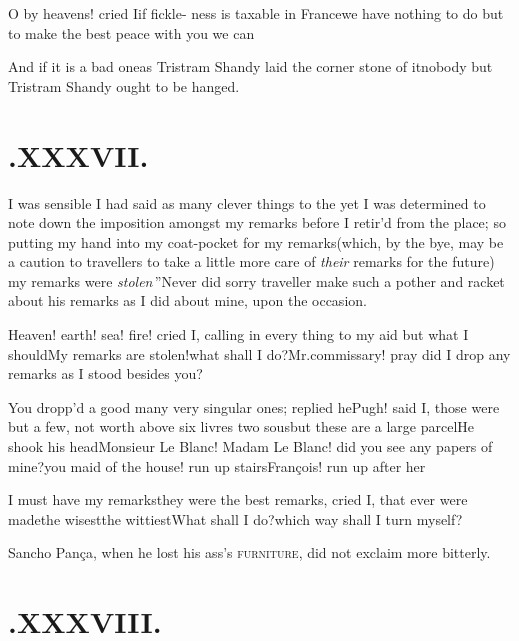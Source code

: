 \documentclass{article}
\begin{document}
\tsh O by heavens! cried I\tsk if
fickle-\break
ness is taxable in France\tsk we have no\-thing to do
but to make the best peace with you we can\tsh\\[4pt]

\tsh And if it is a bad one\tsk as Tris\-tram
Shandy laid the corner stone of it\tsk nobody but Tristram
Shandy ought to be hanged.

\section{.\enspace XXXVII.}

 I was sensible I had said as
many clever things to the
\break 
yet I was determined to note down the imposition amongst my
remarks before I
retir’d from the place; so putting my hand into my
coat-pocket for my remarks\tsk (which, by the bye, may be a
caution to travellers to take a little more care of \textit{their}
remarks for the future) \lqq my\break
\lqq remarks were \textit{stolen}\,”\tsh Never did\break
sorry traveller make
such a pother and racket about his remarks as I did about mine,
upon the occasion.

Heaven! earth! sea! fire! cried I, calling in every thing to my
aid but what I should\tsh My remarks are
stolen!\tsk what shall I do?\tsh Mr.\@ commissary! pray
did I drop any remarks as I stood besides you?\tsh

You dropp’d a good many very singular ones; replied
he\tsh Pugh! said I, those were but a few, not worth above
six livres two sous\tsk but these are a large
parcel\tsh He shook his head\tsh Monsieur Le
Blanc! Madam Le Blanc! did you see any papers of
mine?\tsk you maid of the house! run up
stairs\tsk François! run up after
her\tsh

\tsh I must have my remarks\tsh they were the best
remarks, cried I, that ever were made\tsk the wisest\tsk the
wittiest\tsk What shall I do?\tsk which way shall I turn
myself?

Sancho Pança, when he lost his ass’s
\textsc{furniture}, did not exclaim more bitterly.

\section{.\enspace XXXVIII.}
\end{document}

